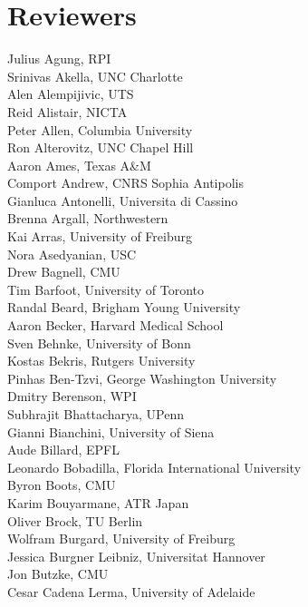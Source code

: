 \chapter{Reviewers}

\vspace{-1.5cm}
\begin{multicols}{3}
{
\noindent
Julius Agung, RPI\\
Srinivas Akella, UNC Charlotte\\
Alen Alempijivic, UTS\\
Reid Alistair, NICTA\\
Peter Allen, Columbia University\\
Ron Alterovitz, UNC Chapel Hill\\
Aaron Ames, Texas A\&M\\
Comport Andrew, CNRS Sophia Antipolis\\
Gianluca Antonelli, Universita di Cassino\\
Brenna Argall, Northwestern\\
Kai Arras, University of Freiburg\\
Nora Asedyanian, USC\\
Drew Bagnell, CMU\\
Tim Barfoot, University of Toronto\\
Randal Beard, Brigham Young University\\
Aaron Becker, Harvard Medical School\\
Sven Behnke, University of Bonn\\
Kostas Bekris, Rutgers University\\
Pinhas Ben-Tzvi, George Washington University\\
Dmitry Berenson, WPI\\
Subhrajit Bhattacharya, UPenn\\
Gianni Bianchini, University of Siena\\
Aude Billard, EPFL\\
Leonardo Bobadilla, Florida International University\\
Byron Boots, CMU\\
Karim Bouyarmane, ATR Japan\\
Oliver Brock, TU Berlin\\
Wolfram Burgard, University of Freiburg\\
Jessica Burgner Leibniz, Universitat Hannover\\
Jon Butzke, CMU\\
Cesar Cadena Lerma, University of Adelaide\\
}
\end{multicols}
